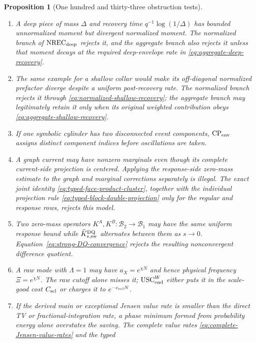 \documentclass[11pt]{article}
\newtheorem{proposition}[theorem]{Proposition}
\newcommand{\cB}{\mathcal B}
\begin{document}
\begin{proposition}[One hundred and thirty-three obstruction tests]
\begin{enumerate}[label=\textup{(T\arabic*)}]
      the latter and never infers it from signed TV.
\item A deep piece of mass $\Delta$ and recovery time
      $q^{-1}\log(1/\Delta)$ has bounded unnormalized moment but divergent
      normalized moment.  The normalized branch of
      $\mathrm{NREC}_{\rm deep}$ rejects it, and the aggregate branch also
      rejects it unless that moment decays at the required deep-envelope
      rate in \eqref{eq:aggregate-deep-recovery}.
\item The same example for a shallow collar would make its off-diagonal
      normalized prefactor diverge despite a uniform post-recovery rate.
      The normalized branch rejects it through
      \eqref{eq:normalized-shallow-recovery}; the aggregate branch may
      legitimately retain it only when its original weighted contribution
      obeys \eqref{eq:aggregate-shallow-recovery}.
\item If one symbolic cylinder has two disconnected event components,
      $\mathrm{CP}_{\rm env}$ assigns distinct component indices before
      oscillations are taken.
\item A graph current may have nonzero marginals even though its complete
      current-side projection is centered.  Applying the response-side
      zero-mass estimate to the graph and marginal corrections separately is
      illegal.  The exact joint identity
      \eqref{eq:typed-face-product-cluster}, together with the individual
      projection rule \eqref{eq:typed-block-double-projection} only for the
      regular and response rows, rejects this model.
\item Two zero-mass operators $K^A,K^B:\cB_2\to\cB_1$ may have the same
      uniform response bound while
      $\widehat K_{s,\rm sw}^{\rm DQ}$ alternates between them as $s\to0$.
      Equation~\eqref{eq:strong-DQ-convergence} rejects the resulting
      nonconvergent difference quotient.
\item A raw mode with $\Lambda=1$ may have $a_X=e^{\chi N}$ and hence
      physical frequency $\Xi=e^{\chi N}$.  The raw cutoff alone misses it;
      $\mathrm{USC}_{\rm end}^{W}$ either puts it in the scale-good cost
      $C_{\rm scl}$ or charges it to $e^{-c_{\rm scl}N}$.
\item If the derived main or exceptional Jensen value rate is smaller than
      the direct TV or fractional-integration rate, a phase minimum formed
      from probability energy alone overstates the saving.  The complete
      value rates \eqref{eq:complete-Jensen-value-rates} and the typed

\end{enumerate}
\end{proposition}
\end{document}
